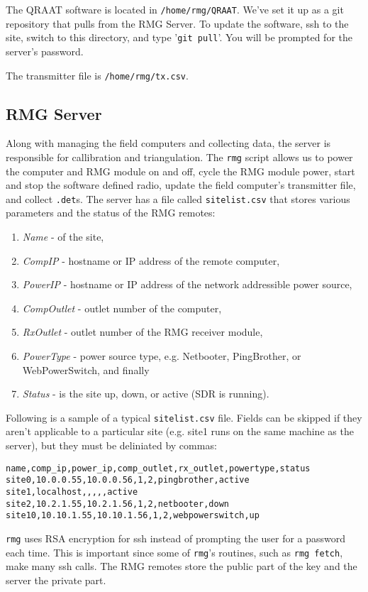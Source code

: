 \documentclass[letter]{article}
\begin{document}
The QRAAT software is located in \texttt{/home/rmg/QRAAT}. We've set it up as a git 
repository that pulls from the RMG Server. To update the software, ssh to the site, 
switch to this directory, and type '\texttt{git pull}'. You will be prompted for 
the server's password.  

The transmitter file is \texttt{/home/rmg/tx.csv}. 

\subsection{RMG Server}
Along with managing the field computers and collecting data, the server is responsible for
callibration and triangulation. The \texttt{rmg} script allows us to power the computer and 
RMG module on and off, cycle the RMG module power, start and stop the software defined radio, 
update the field computer's transmitter file, and collect \texttt{.det}s. The server has a 
file called \texttt{sitelist.csv} that stores various parameters and the status of the RMG remotes:
\begin{enumerate}
  \item \textit{Name} - of the site, 
  \item \textit{CompIP} - hostname or IP address of the remote computer, 
  \item \textit{PowerIP} - hostname or IP address of the network addressible power source,
  \item \textit{CompOutlet} - outlet number of the computer, 
  \item \textit{RxOutlet} - outlet number of the RMG receiver module, 
  \item \textit{PowerType} - power source type, e.g. Netbooter, PingBrother, or WebPowerSwitch, and finally
  \item \textit{Status} - is the site up, down, or active (SDR is running). 
\end{enumerate}
Following is a sample of a typical \texttt{sitelist.csv} file. Fields can be skipped if they aren't applicable
to a particular site (e.g. site1 runs on the same machine as the server), but they must be deliniated by 
commas:
\begin{verbatim}
name,comp_ip,power_ip,comp_outlet,rx_outlet,powertype,status
site0,10.0.0.55,10.0.0.56,1,2,pingbrother,active
site1,localhost,,,,,active
site2,10.2.1.55,10.2.1.56,1,2,netbooter,down
site10,10.10.1.55,10.10.1.56,1,2,webpowerswitch,up
\end{verbatim}

\texttt{rmg} uses RSA encryption for ssh instead of prompting the user for a password each time. This is 
important since some of \texttt{rmg}'s routines, such as \texttt{rmg fetch}, make many ssh calls. The 
RMG remotes store the public part of the key and the server the private part. 
\end{document}
